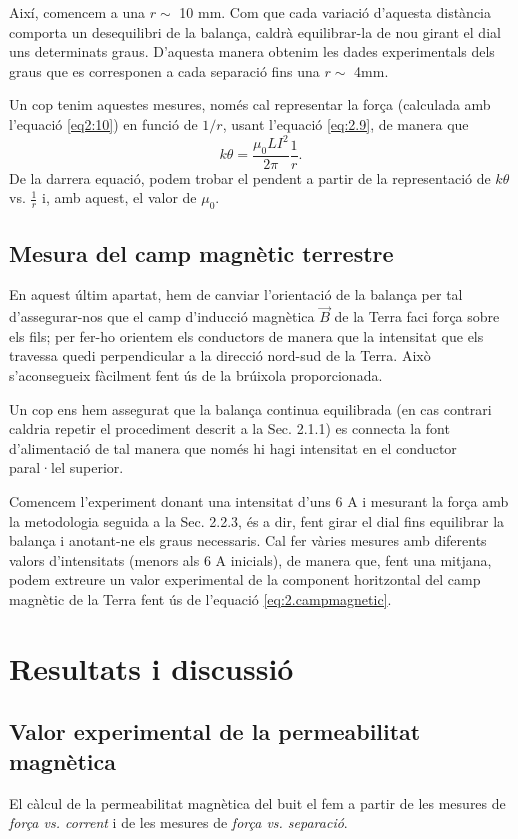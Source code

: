 \documentclass[a4paper,10.5pt]{report}
\begin{document}
Així, comencem a una $r \sim$ 10 mm. Com que cada variació d'aquesta distància comporta un desequilibri de la balança, caldrà equilibrar-la de nou girant el dial uns determinats graus. D'aquesta manera obtenim les dades experimentals dels graus que es corresponen a cada separació fins una $r \sim$ 4mm. 

Un cop tenim aquestes mesures, només cal representar la força (calculada amb l'equació \eqref{eq2:10}) en funció de $1/r$, usant l'equació \eqref{eq:2.9}, de manera que
\begin{equation}
	k\theta = \frac{\mu_0LI^2}{2\pi}\frac{1}{r}. \label{eq:2.13}
\end{equation}
De la darrera equació, podem trobar el pendent a partir de la representació de $k\theta$ vs. $\frac{1}{r}$ i, amb aquest, el valor de $\mu_0$.
\subsection{Mesura del camp magnètic terrestre}
En aquest últim apartat, hem de canviar l'orientació de la balança per tal d'assegurar-nos que el camp d'inducció magnètica $\vec{B}$ de la Terra faci força sobre els fils; per fer-ho orientem els conductors de manera que la intensitat que els travessa quedi perpendicular a la direcció nord-sud de la Terra. Això s'aconsegueix fàcilment fent ús de la brúixola proporcionada.

Un cop ens hem assegurat que la balança continua equilibrada (en cas contrari caldria repetir el procediment descrit a la Sec. 2.1.1) es connecta la font d'alimentació de tal manera que només hi hagi intensitat en el conductor paral·lel superior.

Comencem l'experiment donant una intensitat d'uns 6 A i mesurant la força amb la metodologia seguida a la Sec. 2.2.3, és a dir, fent girar el dial fins equilibrar la balança i anotant-ne els graus necessaris. Cal fer vàries mesures amb diferents valors d'intensitats (menors als 6 A inicials), de manera que, fent una mitjana, podem extreure un valor experimental de la component horitzontal del camp magnètic de la Terra fent ús de l'equació \eqref{eq:2.campmagnetic}.

\section{Resultats i discussió}

\subsection{Valor experimental de la permeabilitat magnètica}
El càlcul de la permeabilitat magnètica del buit el fem a partir de les mesures de \textit{força vs. corrent} i de les mesures de \textit{força vs. separació}. 
\end{document}
